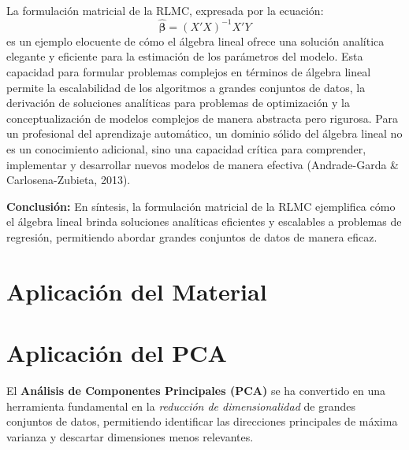 \documentclass[12pt]{article}
\begin{document}
        La formulación matricial de la RLMC, expresada por la ecuación:
        \[
        \hat{\bm{\beta}} = (X'X)^{-1} X'Y
        \]
        es un ejemplo elocuente de cómo el álgebra lineal ofrece una solución analítica elegante y eficiente para la estimación de los parámetros del modelo. Esta capacidad para formular problemas complejos en términos de álgebra lineal permite la escalabilidad de los algoritmos a grandes conjuntos de datos, la derivación de soluciones analíticas para problemas de optimización y la conceptualización de modelos complejos de manera abstracta pero rigurosa. Para un profesional del aprendizaje automático, un dominio sólido del álgebra lineal no es un conocimiento adicional, sino una capacidad crítica para comprender, implementar y desarrollar nuevos modelos de manera efectiva (Andrade-Garda \& Carlosena-Zubieta, 2013).
        
        \noindent
        \textbf{Conclusión:} En síntesis, la formulación matricial de la RLMC ejemplifica cómo el álgebra lineal brinda soluciones analíticas eficientes y escalables a problemas de regresión, permitiendo abordar grandes conjuntos de datos de manera eficaz.
        
        \section{Aplicación del Material}
        \section*{Aplicación del PCA}
        \noindent
        El \textbf{Análisis de Componentes Principales (PCA)} se ha convertido en una herramienta fundamental en la \emph{reducción de dimensionalidad} de grandes conjuntos de datos, permitiendo identificar las direcciones principales de máxima varianza y descartar dimensiones menos relevantes.
        
\end{document}
